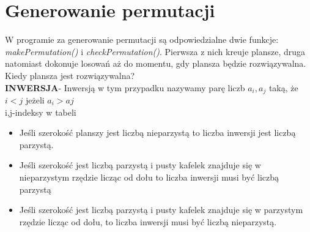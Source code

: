 \documentclass[a4paper,14pt]{report}
\begin{document}
\section{Generowanie permutacji}
W programie za generowanie permutacji są odpowiedzialne dwie funkcje: \textit{makePermutation()} i \textit{checkPermutation()}. Pierwsza z nich kreuje plansze, druga natomiast dokonuje losowań aż do momentu, gdy plansza będzie rozwiązywalna. \\
Kiedy plansza jest rozwiązywalna? \\
\textbf{INWERSJA}- Inwersją w tym przypadku nazywamy parę liczb $a_{i} , a_{j} $ taką, że $i<j $ jeżeli  $ a_{i} > a{j} $ \\
i,j-indeksy w tabeli
\begin{itemize}
	\item Jeśli szerokość planszy jest liczbą nieparzystą to liczba inwersji jest liczbą parzystą.
	\item Jeśli szerokość jest liczbą parzystą i pusty kafelek znajduje się w nieparzystym rzędzie licząc od dołu to liczba inwersji musi być liczbą parzystą
	\item Jeśli szerokość jest liczbą parzystą i pusty kafelek znajduje się w parzystym rzędzie licząc od dołu, to liczba inwersji musi być liczbą nieparzystą.
\end{itemize}
\end{document}
